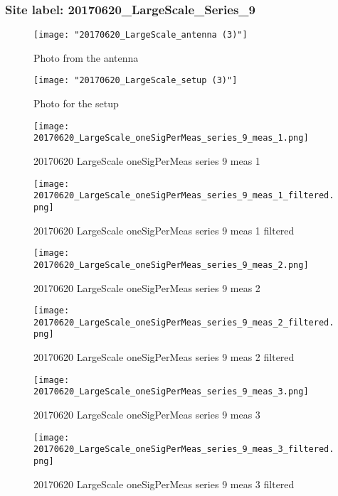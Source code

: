 \subsubsection{Site label: 20170620\_LargeScale\_Series\_9}
\begin{figure}[ht] \caption{Photo from the antenna}
\texttt{[image: "20170620\_LargeScale\_antenna (3)"]}\centering\end{figure}
\begin{figure}[ht] \caption{Photo for the setup}
\texttt{[image: "20170620\_LargeScale\_setup (3)"]}\centering\end{figure}
\begin{figure}[ht] \caption{20170620 LargeScale oneSigPerMeas series 9 meas 1}
\texttt{[image: 20170620\_LargeScale\_oneSigPerMeas\_series\_9\_meas\_1.png]}\centering\end{figure}
\begin{figure}[ht] \caption{20170620 LargeScale oneSigPerMeas series 9 meas 1 filtered}
\texttt{[image: 20170620\_LargeScale\_oneSigPerMeas\_series\_9\_meas\_1\_filtered.png]}\centering\end{figure}
\begin{figure}[ht] \caption{20170620 LargeScale oneSigPerMeas series 9 meas 2}
\texttt{[image: 20170620\_LargeScale\_oneSigPerMeas\_series\_9\_meas\_2.png]}\centering\end{figure}
\begin{figure}[ht] \caption{20170620 LargeScale oneSigPerMeas series 9 meas 2 filtered}
\texttt{[image: 20170620\_LargeScale\_oneSigPerMeas\_series\_9\_meas\_2\_filtered.png]}\centering\end{figure}
\begin{figure}[ht] \caption{20170620 LargeScale oneSigPerMeas series 9 meas 3}
\texttt{[image: 20170620\_LargeScale\_oneSigPerMeas\_series\_9\_meas\_3.png]}\centering\end{figure}
\begin{figure}[ht] \caption{20170620 LargeScale oneSigPerMeas series 9 meas 3 filtered}
\texttt{[image: 20170620\_LargeScale\_oneSigPerMeas\_series\_9\_meas\_3\_filtered.png]}\centering\end{figure}
\clearpage
